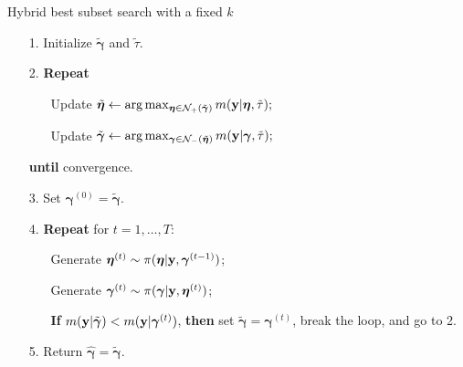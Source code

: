 \documentclass[12pt]{article}
\def\uy{{\bf y}}
\def\bg{{\boldsymbol \gamma}}
\def\ueta{{\boldsymbol \eta}}
\def\ueta{{\boldsymbol \eta}}
\begin{document}
\begin{algorithm}[ht]
 \caption{Hybrid best subset search with a fixed $k$}\label{alg:2}
 \begin{itemize}
  \item[1.] Initialize $\tilde{\bg}$ and $\tilde{\tau}$.
  \item[2.] \textbf{Repeat}
        \begin{itemize}
         \item[] Update $\tilde{\ueta}\leftarrow \arg\max_{\ueta  \in \mathcal{N}_+(\tilde{\bg} ) } m(\uy|\ueta,\tilde{\tau});$
         \item[] Update $\tilde{\bg}\leftarrow  \arg\max_{\bg  \in \mathcal{N}_-(\tilde{\ueta} ) } m(\uy|\bg,\tilde{\tau});$
        \end{itemize}
  \item[] \textbf{until} convergence.
  \item[3.] Set $\bg^{(0)}=\tilde{\bg}$.
  \item[4.] \textbf{Repeat} for $t=1,\ldots,T$:
        \begin{itemize}
         \item[] Generate $\ueta^{(t)}\sim \pi(\ueta|\uy,\bg^{(t-1)})$;
         \item[] Generate $\bg^{(t)}\sim \pi(\bg|\uy,\ueta^{(t)})$;
         \item[] \textbf{If} $m(\uy|\tilde{\bg})<m(\uy|\bg^{(t)})$, \textbf{then} set $\tilde{\bg}=\bg^{(t)}$, break the loop, and go to 2.
        \end{itemize}
  \item[5.] Return $\hat{\bg}=\tilde{\bg}$.
 \end{itemize}
\end{algorithm}
\end{document}
